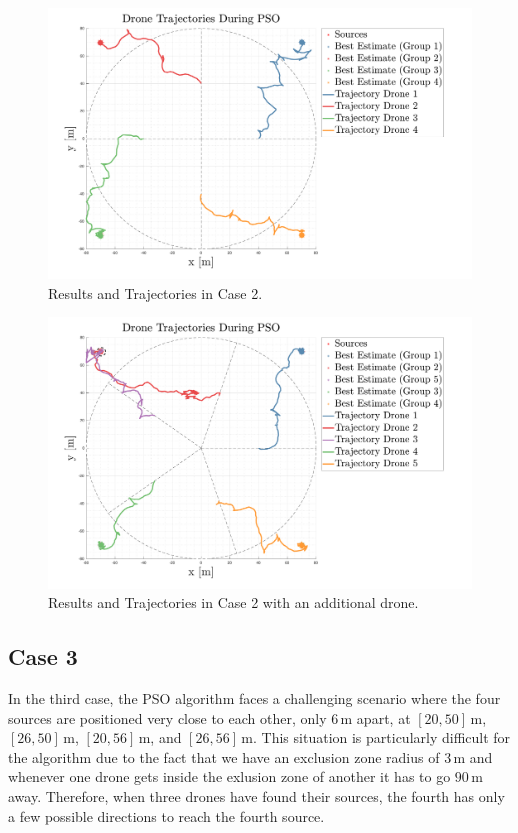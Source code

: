 \begin{figure}
    \centering
    \includegraphics[width=1.06\textwidth]{images/case_2.pdf}
    \caption[PSO Case 2]{Results and Trajectories in Case 2.}
    \label{fig:case2}
\end{figure}
\begin{figure}[H]
    \centering
    \includegraphics[width=1.06\textwidth]{images/case_2_more.pdf}
    \caption[PSO Case 2]{Results and Trajectories in Case 2 with an additional drone.}
    \label{fig:case2more}
\end{figure}

\subsection{Case 3}
In the third case, the PSO algorithm faces a challenging scenario where 
the four sources are positioned very close to each other, only \(6 \, \text{m}\) apart, 
at \([20, 50] \, \text{m}\), \([26, 50] \, \text{m}\), \([20, 56] \, \text{m}\), and \([26, 56] \, \text{m}\). 
This situation is particularly difficult for the algorithm due to 
the fact that we have an exclusion zone radius of \(3 \, \text{m}\) and 
whenever one drone gets inside the exlusion zone of another
it has to go \(90 \, \text{m}\) away.
Therefore, when three drones have found their sources, the fourth has only a few
possible directions to reach the fourth source.

